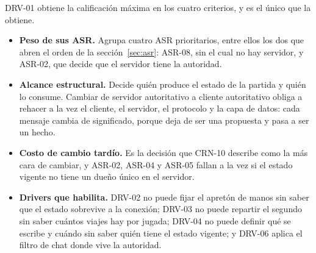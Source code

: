 DRV-01 obtiene la calificación máxima en los cuatro criterios, y es el único que la obtiene.

\begin{itemize}
  \item \textbf{Peso de sus ASR.} Agrupa cuatro ASR prioritarios, entre ellos los dos que abren el orden de la sección~\ref{sec:asr}: ASR-08, sin el cual no hay servidor, y ASR-02, que decide que el servidor tiene la autoridad.
  \item \textbf{Alcance estructural.} Decide quién produce el estado de la partida y quién lo consume. Cambiar de servidor autoritativo a cliente autoritativo obliga a rehacer a la vez el cliente, el servidor, el protocolo y la capa de datos: cada mensaje cambia de significado, porque deja de ser una propuesta y pasa a ser un hecho.
  \item \textbf{Costo de cambio tardío.} Es la decisión que CRN-10 describe como la más cara de cambiar, y ASR-02, ASR-04 y ASR-05 fallan a la vez si el estado vigente no tiene un dueño único en el servidor.
  \item \textbf{Drivers que habilita.} DRV-02 no puede fijar el apretón de manos sin saber que el estado sobrevive a la conexión; DRV-03 no puede repartir el segundo sin saber cuántos viajes hay por jugada; DRV-04 no puede definir qué se escribe y cuándo sin saber quién tiene el estado vigente; y DRV-06 aplica el filtro de chat donde vive la autoridad.
\end{itemize}
